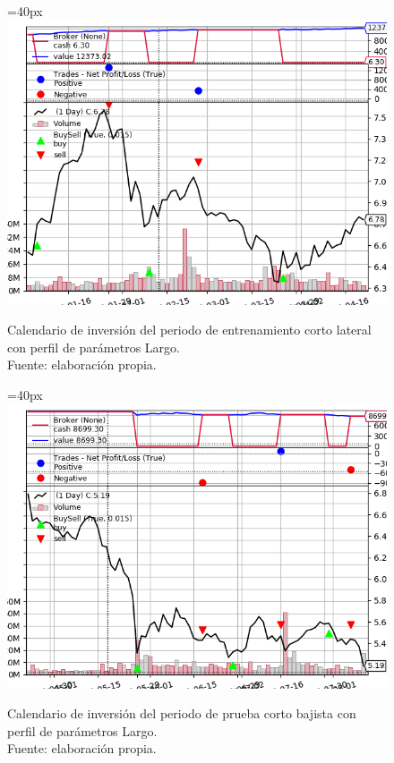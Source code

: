       	\begin{figure}[H]
      		\centering\leftskip=40px
      		\includegraphics[scale=0.66]{imagenes/S_Large_train.png}
      		\caption[Calendario de inversi\'on del periodo de entrenamiento corto lateral]{Calendario de inversi\'on del periodo de entrenamiento corto lateral con perfil de par\'ametros Largo.\\ Fuente: elaboraci\'on propia.}
      		\label{fig:short_period_downtrain}
      	\end{figure}
      	
     	\begin{figure}[H]
     		\centering\leftskip=40px
     		\includegraphics[scale=0.66]{imagenes/S_Large_test.png}
     		\caption[Calendario de inversi\'on del periodo de prueba corto bajista]{Calendario de inversi\'on del periodo de prueba corto bajista con perfil de par\'ametros Largo.\\ Fuente: elaboraci\'on propia.}
     		\label{fig:short_period_downtest}
     	\end{figure} 

